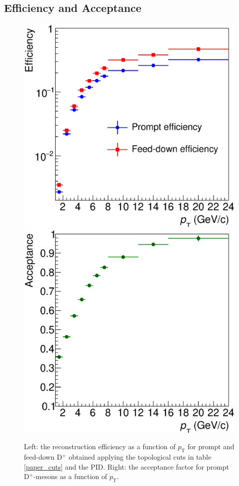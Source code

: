 \documentclass[b5paper,10pt,twoside,oldstyle,classica]{toptesi}
\newcommand{\pt}{p_\text{T}}
\begin{document}
\subsection{Efficiency and Acceptance}
\label{effacc_sec}
\begin{figure}[tb]
\begin{center}
{\includegraphics[scale = 0.32]{Eff_Dplus_PaperCuts.eps}}
\hspace{-0.5cm}
{\includegraphics[scale = 0.32]{Acc_Dplus.eps}}
\caption{Left: the reconstruction efficiency as a function of $\pt$ for prompt and feed-down D$^+$ obtained applying the topological cuts in table \ref{paper_cuts} and the PID. Right: the acceptance factor for prompt D$^+$-mesons as a function of $\pt$.}
\label{effacc_paper}
\end{center}
\end{figure}
\end{document}

